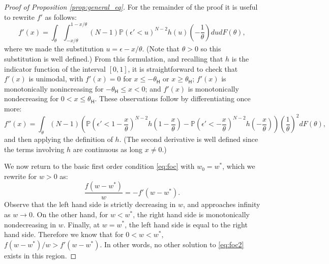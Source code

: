 \documentclass[11pt]{article}
\renewcommand{\H}{\ensuremath{\mathsf{H}}}
\renewcommand{\P}{\ensuremath{\mathbb{P}}}
\begin{document}
\begin{proof}[Proof of Proposition \ref{prop:general_eq}]
For the remainder of the proof it is useful to rewrite $f'$ as follows:
\begin{equation}
\label{eq:fprime2}
 f'(x) = \int_\theta \int_{-x/\theta}^{1-x/\theta} (N-1) \P\left(\epsilon' < u\right)^{N-2} h\left( u \right) \left( - \frac{1}{\theta} \right) du dF(\theta),
\end{equation}
where we made the substitution $u = \epsilon - x/\theta$.
(Note that $\theta > 0$ so this substitution is well defined.)
From this formulation, and recalling that $h$ is the indicator function of the interval $[0,1]$, it is straightforward to check that $f'(x)$ is unimodal, with $f'(x) = 0$ for $x \leq -\theta_{\H}$ or $x \geq \theta_{\H}$;
$f'(x)$ is monotonically nonincreasing for $-\theta_{\H} \leq x < 0$;
and $f'(x)$ is monotonically nondecreasing for $0 < x \leq \theta_{\H}$.
These observations follow by differentiating once more:
\[ f''(x) = \int_\theta (N-1) \left(\P\left(\epsilon' < 1 - \frac{x}{\theta}\right)^{N-2} h\left( 1 - \frac{x}{\theta}\right) - \P\left(\epsilon' < -\frac{x}{\theta}\right)^{N-2} h\left( - \frac{x}{\theta}\right) \right) \left( \frac{1}{\theta} \right)^2 dF(\theta), \]
and then applying the definition of $h$.
(The second derivative is well defined since the terms involving $h$ are continuous as long $x \neq 0$.)

We now return to the basic first order condition \eqref{eq:foc} with $w_0 = w^*$, which we rewrite for $w > 0$ as:
\begin{equation}
\label{eq:foc2}
\frac{f(w-w^*)}{w} = - f'(w - w^*).
\end{equation}
Observe that the left hand side is strictly decreasing in $w$, and approaches infinity as $w \to 0$.
On the other hand, for $w < w^*$, the right hand side is monotonically nondecreasing in $w$.
Finally, at $w = w^*$, the left hand side is equal to the right hand side.
Therefore we know that for $0 < w < w^*$, $f(w - w^*)/w > f'(w - w^*)$.
In other words, no other solution to \eqref{eq:foc2} exists in this region.


\end{proof}
\end{document}
